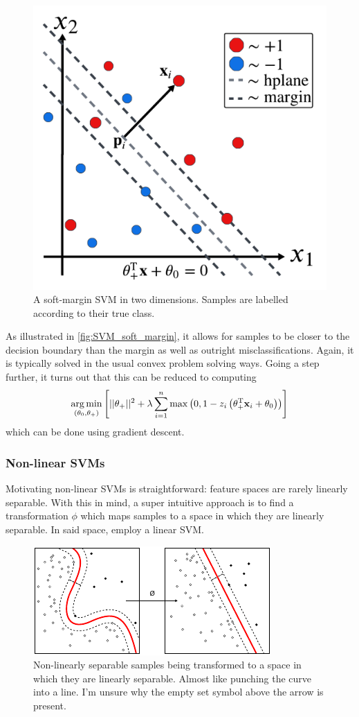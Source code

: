 \documentclass[11pt]{article}
\begin{document}
\begin{figure}[ht]
    \centering
    \includegraphics[width=0.75\columnwidth]{./figures/supervised_learning/SVMs/SVM_soft_margin.pdf}
    \caption{A soft-margin SVM in two dimensions. Samples are labelled according to their true class.}
    \label{fig:SVM_soft_margin}
\end{figure}

\noindent As illustrated in \autoref{fig:SVM_soft_margin}, it allows for samples to be closer to the decision boundary than the margin as well as outright misclassifications. Again, it is typically solved in the usual convex problem solving ways. Going a step further, it turns out that this can be reduced to computing
$$
\operatorname*{arg\,min}_{(\theta_0,\theta_+)}\left[||\theta_+||^2+\lambda\sum_{i=1}^n\max\left(0,1-z_i\left(\theta_+^{\text{T}}\mathbf{x}_i+\theta_0\right)\right)\right]
$$
which can be done using gradient descent.

\subsubsection{Non-linear SVMs}
Motivating non-linear SVMs is straightforward: feature spaces are rarely linearly separable. With this in mind, a super intuitive approach is to find a transformation $\phi$ which maps samples to a space in which they are linearly separable. In said space, employ a linear SVM. 

\begin{figure}[ht]
    \centering
    \includegraphics[width=0.75\columnwidth]{./figures/supervised_learning/SVMs/SVM_non_linear.pdf}
    \caption{Non-linearly separable samples being transformed to a space in which they are linearly separable. Almost like punching the curve into a line. I'm unsure why the empty set symbol above the arrow is present.}
    \label{fig:SVM_non_linear}
\end{figure}
\end{document}
